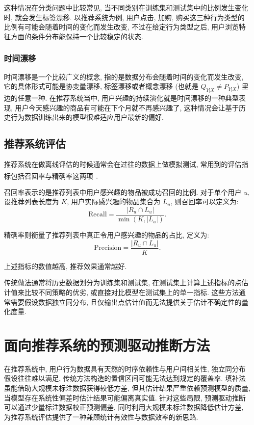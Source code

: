 \documentclass[a4paper, AutoFakeBold, UTF8]{ctexrep}
\theoremstyle{plain}
\newcommand{\upcite}[1]
{\textsuperscript{~\cite{#1}}}
\numberwithin{equation}{chapter}
\begin{document}
这种情况在分类问题中比较常见, 当不同类别在训练集和测试集中的比例发生变化时, 就会发生标签漂移. 以推荐系统为例, 用户点击, 加购, 购买这三种行为类型的比例有可能会随着时间的变化而发生改变, 不过在给定行为类型之后, 用户浏览特征方面的条件分布能保持一个比较稳定的状态. 

\subsection{时间漂移}

时间漂移是一个比较广义的概念, 指的是数据分布会随着时间的变化而发生改变, 它的具体形式可能是协变量漂移, 标签漂移或者概念漂移 (也就是 $Q_{Y|X} \neq P_{Y|X}$) 里边的任意一种. 在推荐系统当中, 用户兴趣的持续演化就是时间漂移的一种典型表现, 用户今天感兴趣的商品有可能在下个月就不再感兴趣了, 这种情况会让基于历史行为数据训练出来的模型很难适应用户最新的偏好. 


\section{推荐系统评估}

推荐系统在做离线评估的时候通常会在过往的数据上做模拟测试, 常用到的评估指标包括召回率与精确率这两项\upcite{Herlocker2004}. 

召回率表示的是推荐列表中用户感兴趣的物品被成功召回的比例. 对于单个用户 $u$, 设推荐列表长度为 $K$, 用户实际感兴趣的物品集合为 $L_u$, 则召回率可以定义为: 
\begin{equation}
\text{Recall} = \frac{|R_u \cap L_u|}{\min (K, |L_u|) }.
\end{equation}

精确率则衡量了推荐列表中真正令用户感兴趣的物品的占比, 定义为: 
\begin{equation}
\text{Precision} = \frac{|R_u \cap L_u|}{K}.
\end{equation}

上述指标的数值越高, 推荐效果通常越好. 

传统做法通常将历史数据划分为训练集和测试集, 在测试集上计算上述指标的点估计值来比较不同策略的优劣, 或直接对比模型在测试集上的单一指标. 这些方法通常需要假设数据独立同分布, 且仅输出点估计值而无法提供关于估计不确定性的量化度量. 


\chapter{面向推荐系统的预测驱动推断方法}

在推荐系统中, 用户行为数据具有天然的时序依赖性与用户间相关性, 独立同分布假设往往难以满足, 传统方法构造的置信区间可能无法达到规定的覆盖率. 填补法虽能借助大规模未标注数据获得较低方差, 但其估计结果严重依赖预测模型的质量, 当模型存在系统性偏差时估计结果可能偏离真实值. 针对这些局限, 预测驱动推断可以通过少量标注数据校正预测偏差, 同时利用大规模未标注数据降低估计方差, 为推荐系统评估提供了一种兼顾统计有效性与数据效率的新思路. 
\end{document}

